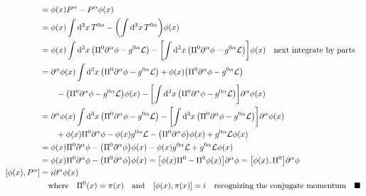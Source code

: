 \documentclass{article}
\begin{document}
\begin{align*}
    [\phi(x),P^\alpha] & =\phi(x)P^\alpha-P^\alpha \phi(x)                                                                                                                                                               \\
                       & =\phi(x)\int\dd[3]{x}T^{0\alpha}-\pqty{\int\dd[3]{x}T^{0\alpha}} \phi(x)                                                                                                                        \\
                       & =\phi(x)\int\dd[3]{x}\pqty{\Pi^0\partial^\alpha \phi-g^{0\alpha}\mathcal{L}}-\bqty{\int\dd[3]{x}\pqty{\Pi^0\partial^\alpha \phi-g^{0\alpha}\mathcal{L}}} \phi(x)\qq{next integrate by parts}    \\
                       & =\partial^\alpha \phi(x)\int\dd[3]{x}\pqty{\Pi^0\partial^\alpha \phi-g^{0\alpha}\mathcal{L}}+\phi(x)\pqty{\Pi^0\partial^\alpha \phi-g^{0\alpha}\mathcal{L}}                                     \\
                       & \qquad-\pqty{\Pi^0\partial^\alpha \phi-g^{0\alpha}\mathcal{L}}\phi(x)-\bqty{\int\dd[3]{x}\pqty{\Pi^0\partial^\alpha \phi-g^{0\alpha}\mathcal{L}}} \partial^\alpha\phi(x)                        \\
                       & =\partial^\alpha \phi(x)\int\dd[3]{x}\pqty{\Pi^0\partial^\alpha \phi-g^{0\alpha}\mathcal{L}}-\bqty{\int\dd[3]{x}\pqty{\Pi^0\partial^\alpha \phi-g^{0\alpha}\mathcal{L}}} \partial^\alpha\phi(x) \\
                       & \qquad +\phi(x)\Pi^0\partial^\alpha \phi-\phi(x)g^{0\alpha}\mathcal{L}-\pqty{\Pi^0\partial^\alpha \phi}\phi(x)+g^{0\alpha}\mathcal{L}\phi(x)                                                    \\
                       & =\phi(x)\Pi^0\partial^\alpha \phi-\pqty{\Pi^0\partial^\alpha \phi}\phi(x)-\phi(x)g^{0\alpha}\mathcal{L}+g^{0\alpha}\mathcal{L}\phi(x)                                                           \\
                       & =\phi(x)\Pi^0\partial^\alpha \phi-\pqty{\Pi^0\partial^\alpha \phi}\phi(x)=\bqty{\phi(x)\Pi^0-\Pi^0 \phi(x)}\partial^\alpha \phi=\bqty{\phi(x),\Pi^0}\partial^\alpha \phi                        \\
    [\phi(x),P^\alpha] & =i\partial^\alpha \phi   (x)                                                                                                                                                                    \\
                       & \qq{where}\Pi^0(x)=\pi(x)\qand\bqty{\phi(x),\pi(x)}=i\qq{recognizing the conjugate momentum}\blacksquare
\end{align*}
\end{document}
